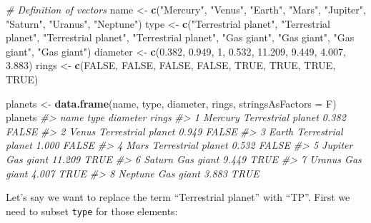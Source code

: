 \documentclass[]{book}
\newenvironment{Shaded}{\begin{snugshade}}{\end{snugshade}}
\newcommand{\KeywordTok}[1]{\textcolor[rgb]{0.13,0.29,0.53}{\textbf{#1}}}
\newcommand{\DataTypeTok}[1]{\textcolor[rgb]{0.13,0.29,0.53}{#1}}
\newcommand{\DecValTok}[1]{\textcolor[rgb]{0.00,0.00,0.81}{#1}}
\newcommand{\FloatTok}[1]{\textcolor[rgb]{0.00,0.00,0.81}{#1}}
\newcommand{\StringTok}[1]{\textcolor[rgb]{0.31,0.60,0.02}{#1}}
\newcommand{\CommentTok}[1]{\textcolor[rgb]{0.56,0.35,0.01}{\textit{#1}}}
\newcommand{\OtherTok}[1]{\textcolor[rgb]{0.56,0.35,0.01}{#1}}
\newcommand{\OperatorTok}[1]{\textcolor[rgb]{0.81,0.36,0.00}{\textbf{#1}}}
\newcommand{\NormalTok}[1]{#1}
\begin{document}
\begin{Shaded}
\begin{Highlighting}[]
\CommentTok{# Definition of vectors}
\NormalTok{name <-}\StringTok{ }\KeywordTok{c}\NormalTok{(}\StringTok{"Mercury"}\NormalTok{, }\StringTok{"Venus"}\NormalTok{, }\StringTok{"Earth"}\NormalTok{, }\StringTok{"Mars"}\NormalTok{, }\StringTok{"Jupiter"}\NormalTok{, }\StringTok{"Saturn"}\NormalTok{, }\StringTok{"Uranus"}\NormalTok{, }\StringTok{"Neptune"}\NormalTok{)}
\NormalTok{type <-}\StringTok{ }\KeywordTok{c}\NormalTok{(}\StringTok{"Terrestrial planet"}\NormalTok{, }\StringTok{"Terrestrial planet"}\NormalTok{, }\StringTok{"Terrestrial planet"}\NormalTok{, }\StringTok{"Terrestrial planet"}\NormalTok{, }\StringTok{"Gas giant"}\NormalTok{, }\StringTok{"Gas giant"}\NormalTok{, }\StringTok{"Gas giant"}\NormalTok{, }\StringTok{"Gas giant"}\NormalTok{)}
\NormalTok{diameter <-}\StringTok{ }\KeywordTok{c}\NormalTok{(}\FloatTok{0.382}\NormalTok{, }\FloatTok{0.949}\NormalTok{, }\DecValTok{1}\NormalTok{, }\FloatTok{0.532}\NormalTok{, }\FloatTok{11.209}\NormalTok{, }\FloatTok{9.449}\NormalTok{, }\FloatTok{4.007}\NormalTok{, }\FloatTok{3.883}\NormalTok{)}
\NormalTok{rings <-}\StringTok{ }\KeywordTok{c}\NormalTok{(}\OtherTok{FALSE}\NormalTok{, }\OtherTok{FALSE}\NormalTok{, }\OtherTok{FALSE}\NormalTok{, }\OtherTok{FALSE}\NormalTok{, }\OtherTok{TRUE}\NormalTok{, }\OtherTok{TRUE}\NormalTok{, }\OtherTok{TRUE}\NormalTok{, }\OtherTok{TRUE}\NormalTok{)}

\NormalTok{planets <-}\StringTok{ }\KeywordTok{data.frame}\NormalTok{(name, type, diameter, rings, }\DataTypeTok{stringsAsFactors =}\NormalTok{ F)}
\NormalTok{planets}
\CommentTok{#>      name               type diameter rings}
\CommentTok{#> 1 Mercury Terrestrial planet    0.382 FALSE}
\CommentTok{#> 2   Venus Terrestrial planet    0.949 FALSE}
\CommentTok{#> 3   Earth Terrestrial planet    1.000 FALSE}
\CommentTok{#> 4    Mars Terrestrial planet    0.532 FALSE}
\CommentTok{#> 5 Jupiter          Gas giant   11.209  TRUE}
\CommentTok{#> 6  Saturn          Gas giant    9.449  TRUE}
\CommentTok{#> 7  Uranus          Gas giant    4.007  TRUE}
\CommentTok{#> 8 Neptune          Gas giant    3.883  TRUE}
\end{Highlighting}
\end{Shaded}

Let's say we want to replace the term ``Terrestrial planet'' with
``TP''. First we need to subset \texttt{type} for those elements:

\begin{Shaded}
\end{Shaded}
\end{document}
